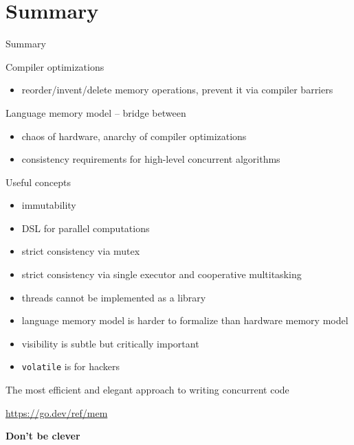 \section{Summary}

\begin{frame}{Summary}

Compiler optimizations
\begin{itemize}
 \item reorder/invent/delete memory operations, prevent it via compiler barriers
\end{itemize}

Language memory model -- bridge between
\begin{itemize}  
    \item chaos of hardware, anarchy of compiler optimizations    
    \item consistency requirements for high-level concurrent algorithms       
\end{itemize}

Useful concepts
\begin{itemize}
  \item immutability
  \item DSL for parallel computations
  \item strict consistency via mutex
  \item strict consistency via single executor and cooperative multitasking
  \item threads cannot be implemented as a library
  \item language memory model is harder to formalize than hardware memory model
  \item visibility is subtle but critically important
  \item \texttt{volatile} is for hackers
\end{itemize}

\end{frame}


\begin{frame}{The most efficient and elegant approach to writing concurrent code}
\begin{center}
\url{https://go.dev/ref/mem}
\end{center}

\pause
\begin{center}
\textbf{Don't be clever}
\end{center}



\end{frame}




